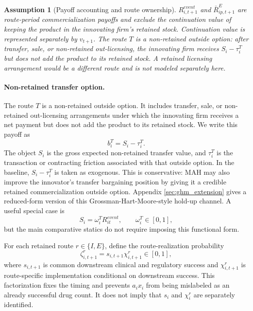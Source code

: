 \documentclass[12pt]{article}
\newtheorem{assumption}{Assumption}
\newcommand{\1}{\mathbf{1}}
\begin{document}
\begin{assumption}[Payoff accounting and route ownership]
$R^{event}_{i,t+1}$ and $\bar R^E_{ip,t+1}$ are route-period commercialization payoffs and exclude the continuation value of keeping the product in the innovating firm's retained stock. Continuation value is represented separately by $v_{t+1}$. The route $T$ is a non-retained outside option: after transfer, sale, or non-retained out-licensing, the innovating firm receives $S_i-\tau_i^T$ but does not add the product to its retained stock. A retained licensing arrangement would be a different route and is not modeled separately here.
\end{assumption}

\paragraph{Non-retained transfer option.}
The route $T$ is a non-retained outside option. It includes transfer, sale, or non-retained out-licensing arrangements under which the innovating firm receives a net payment but does not add the product to its retained stock. We write this payoff as
\begin{equation}
    b^T_i=S_i-\tau_i^T.
    \label{eq:transfer_payoff}
\end{equation}
The object $S_i$ is the gross expected non-retained transfer value, and $\tau_i^T$ is the transaction or contracting friction associated with that outside option. In the baseline, $S_i-\tau_i^T$ is taken as exogenous. This is conservative: MAH may also improve the innovator's transfer bargaining position by giving it a credible retained commercialization outside option. Appendix \ref{sec:ghm_extension} gives a reduced-form version of this Grossman-Hart-Moore-style hold-up channel. A useful special case is
\begin{equation}
    S_i=\omega_i^T R^{event}_{it},
    \qquad
    \omega_i^T\in[0,1],
    \label{eq:transfer_special_case}
\end{equation}
but the main comparative statics do not require imposing this functional form.

For each retained route $r\in\{I,E\}$, define the route-realization probability
\begin{equation}
    \zeta^r_{i,t+1}=s_{i,t+1}\chi^r_{i,t+1}\in[0,1],
    \label{eq:zeta_decomposition}
\end{equation}
where $s_{i,t+1}$ is common downstream clinical and regulatory success and $\chi^r_{i,t+1}$ is route-specific implementation conditional on downstream success. This factorization fixes the timing and prevents $a_i x_i$ from being mislabeled as an already successful drug count. It does not imply that $s_i$ and $\chi_i^r$ are separately identified.
\end{document}
